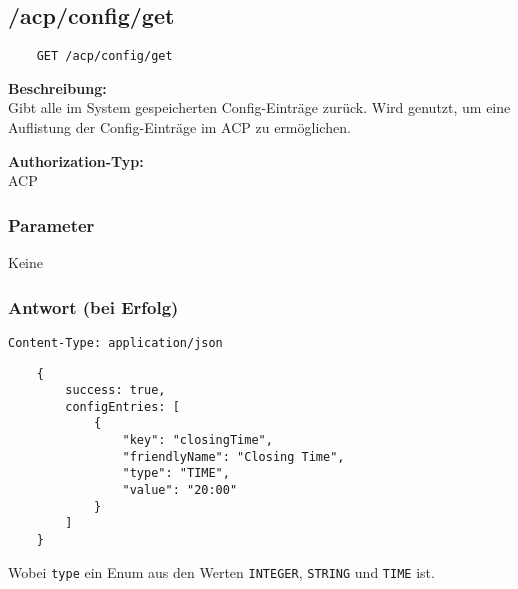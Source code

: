 \subsection{/acp/config/get}

\begin{lstlisting}
    GET /acp/config/get
\end{lstlisting}

\textbf{Beschreibung:} \\
Gibt alle im System gespeicherten Config-Einträge zurück. Wird genutzt, um eine Auflistung der Config-Einträge im ACP zu ermöglichen.

\textbf{Authorization-Typ:} \\
ACP

\subsubsection{Parameter}
Keine

\subsubsection{Antwort (bei Erfolg)}

\lstinline{Content-Type: application/json}
\begin{lstlisting}
    {
        success: true, 
        configEntries: [
            {
                "key": "closingTime",
                "friendlyName": "Closing Time",
                "type": "TIME",
                "value": "20:00"
            }
        ]
    }
\end{lstlisting}

Wobei \lstinline{type} ein Enum aus den Werten \lstinline{INTEGER}, \lstinline{STRING} und \lstinline{TIME} ist.